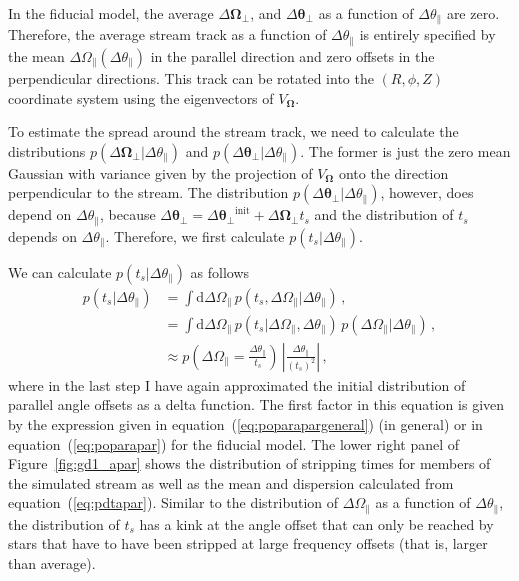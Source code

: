 \documentclass[12pt,preprint]{aastex}
\newcommand{\dd}{\mathrm{d}}
\newcommand{\eqnname}{equation}
\newcommand{\equationname}{\eqnname}
\renewcommand{\figurename}{Figure}
\renewcommand{\vec}[1]{\ensuremath{\mathbf{#1}}}
\newcommand{\veco}{\ensuremath{\vec{\Omega}}}
\newcommand{\veca}{\ensuremath{\boldsymbol\theta}}
\newcommand{\apar}{\ensuremath{\theta_\parallel}}
\newcommand{\opar}{\ensuremath{\Omega_\parallel}}
\newcommand{\aperp}{\ensuremath{\veca_\perp}}
\newcommand{\operp}{\ensuremath{\veco_\perp}}
\newcommand{\ts}{\ensuremath{t_s}}
\begin{document}
In the fiducial model, the average $\Delta \operp$, and $\Delta
\aperp$ as a function of $\Delta \apar$ are zero. Therefore, the
average stream track as a function of $\Delta \apar$ is entirely
specified by the mean $\Delta \opar(\Delta \apar)$ in the parallel
direction and zero offsets in the perpendicular directions. This track
can be rotated into the $(R,\phi,Z)$ coordinate system using the
eigenvectors of $V_\veco$.

To estimate the spread around the stream track, we need to calculate
the distributions $p(\Delta \operp|\Delta \apar)$ and $p(\Delta
\aperp|\Delta \apar)$. The former is just the zero mean Gaussian with
variance given by the projection of $V_\veco$ onto the direction
perpendicular to the stream. The distribution $p(\Delta \aperp|\Delta
\apar)$, however, does depend on $\Delta \apar$, because $\Delta
\aperp = \Delta \aperp^{\mathrm{init}} + \Delta \operp \ts$ and
the distribution of $\ts$ depends on $\Delta \apar$. Therefore,
we first calculate $p(\ts | \Delta \apar)$.

We can calculate $p(\ts | \Delta \apar)$ as follows
\begin{equation}\label{eq:pdtapar}
\begin{split}
  p(\ts | \Delta \apar) & = \int \dd \Delta \opar\,p(\ts,\Delta \opar|\Delta \apar)\,,\\
  & = \int \dd \Delta \opar\,p(\ts|\Delta \opar,\Delta \apar)\,p(\Delta \opar|\Delta \apar)\,,\\
  & \approx p\left(\Delta \opar = \frac{\Delta \apar}{\ts}\right)\,\left|\frac{\Delta \apar}{(\ts)^2}\right|\,,
\end{split}
\end{equation}
where in the last step I have again approximated the initial
distribution of parallel angle offsets as a delta function. The first
factor in this equation is given by the expression given in
\equationname~(\ref{eq:poparapargeneral}) (in general) or in
\equationname~(\ref{eq:poparapar}) for the fiducial model. The lower
right panel of \figurename~\ref{fig:gd1_apar} shows the distribution
of stripping times for members of the simulated stream as well as the
mean and dispersion calculated from
\equationname~(\ref{eq:pdtapar}). Similar to the distribution of
$\Delta \opar$ as a function of $\Delta \apar$, the distribution of
$\ts$ has a kink at the angle offset that can only be reached by stars
that have to have been stripped at large frequency offsets (that is,
larger than average).
\end{document}
